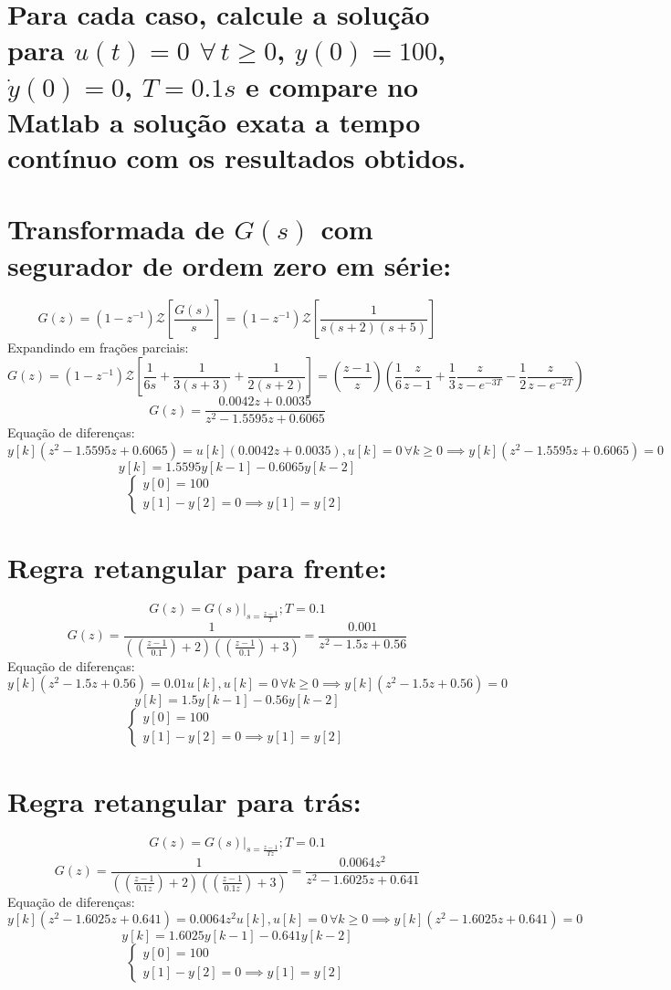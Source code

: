 \documentclass{article}
\begin{document}
\section*{Para cada caso, calcule a solução para $u(t) = 0$ $\forall\, t \geq 0$, $y(0) = 100$, $\dot{y}(0) = 0$, $T = 0.1s$ e compare no Matlab a solução exata a tempo contínuo com os resultados obtidos.}

\section{Transformada de $ G(s) $ com segurador de ordem zero em série:}
    \[ G(z) = (1-z^{-1}) \mathcal{Z}\left[ \frac{G(s)}{s} \right] = (1-z^{-1}) \mathcal{Z}\left[ \frac{1}{s(s+2)(s+5)} \right] \]
    {Expandindo em frações parciais:}
    \[ G(z) = (1-z^{-1}) \mathcal{Z}\left[ \frac{1}{6s} + \frac{1}{3(s+3)} + \frac{1}{2(s+2)} \right] = \left( \frac{z-1}{z} \right) \left( \frac 1 6 \frac{z}{z-1} + \frac 1 3 \frac{z}{z-e^{-3T}} - \frac 1 2 \frac{z}{z-e^{-2T}} \right) \]
    \[ G(z) = \frac{ 0.0042z + 0.0035 }{ z^2 - 1.5595z + 0.6065 } \]
    {Equação de diferenças:}
    \[ y[k](z^2 - 1.5595z + 0.6065) = u[k](0.0042z + 0.0035), u[k] = 0 \,\forall k \geq 0 \implies y[k](z^2 - 1.5595z + 0.6065) = 0 \]
    \[ y[k] = 1.5595 y[k-1] - 0.6065 y[k-2] \]
    \[ \begin{cases}
        y[0] = 100\\
        y[1] - y[2] = 0 \implies y[1] = y[2]
    \end{cases}\]


\section{Regra retangular para frente:}
    \[ G(z) = \left.G(s)\right|_{s=\frac{z-1}{T}}; T = 0.1 \]
    \[ G(z) = \frac{1}{\left( \left( \frac{z-1}{0.1}\right) +2 \right)\left( \left( \frac{z-1}{0.1}\right) +3 \right)} = \frac{0.001}{z^2 - 1.5z + 0.56} \]
    {Equação de diferenças:}
    \[ y[k](z^2 - 1.5z + 0.56) = 0.01 u[k], u[k] = 0 \,\forall k \geq 0 \implies y[k](z^2 - 1.5z + 0.56) = 0 \]
    \[ y[k] = 1.5 y[k-1] - 0.56 y[k-2] \]
    \[ \begin{cases}
        y[0] = 100\\
        y[1] - y[2] = 0 \implies y[1] = y[2]
    \end{cases}\]


\section{Regra retangular para trás:}
    \[ G(z) = \left.G(s)\right|_{s=\frac{z-1}{Tz}}; T = 0.1 \]
    \[ G(z) = \frac{1}{\left( \left( \frac{z-1}{0.1z} \right) +2 \right)\left( \left( \frac{z-1}{0.1z} \right) +3 \right)} = \frac{0.0064 z^2}{z^2 - 1.6025z + 0.641} \]
    {Equação de diferenças:}
    \[ y[k](z^2 - 1.6025z + 0.641) = 0.0064 z^2 u[k], u[k] = 0 \,\forall k \geq 0 \implies y[k](z^2 - 1.6025z + 0.641) = 0 \]
    \[ y[k] = 1.6025 y[k-1] - 0.641 y[k-2] \]
    \[ \begin{cases}
        y[0] = 100\\
        y[1] - y[2] = 0 \implies y[1] = y[2]
    \end{cases}\]
\end{document}
